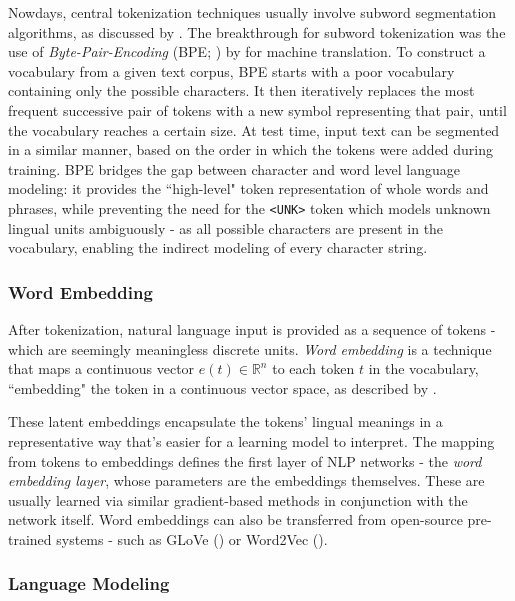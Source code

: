 \documentclass{article}
\begin{document}
\medskip
\noindent
Nowdays, central tokenization techniques usually involve subword segmentation algorithms, as discussed by \citet{mielke2021between}. The breakthrough for subword tokenization was the use of \emph{Byte-Pair-Encoding} (BPE; \citet{gage1994new}) by \citet{sennrich2015neural} for machine translation. To construct a vocabulary from a given text corpus, BPE starts with a poor vocabulary containing only the possible characters. It then iteratively replaces the most frequent successive pair of tokens with a new symbol representing that pair, until the vocabulary reaches a certain size. At test time, input text can be segmented in a similar manner, based on the order in which the tokens were added during training. BPE bridges the gap between character and word level language modeling: it provides the ``high-level" token representation of whole words and phrases, while preventing the need for the \texttt{<UNK>} token which models unknown lingual units ambiguously - as all possible characters are present in the vocabulary, enabling the indirect modeling of every character string.

\subsubsection{Word Embedding}
\label{subsec:embeddings}

After tokenization, natural language input is provided as a sequence of tokens - which are seemingly meaningless discrete units. \emph{Word embedding} is a technique that maps a continuous vector $e(t) \in \mathbb{R}^n$ to each token $t$ in the vocabulary, ``embedding" the token in a continuous vector space, as described by \citet{almeida2019word}.

\medskip
\noindent
These latent embeddings encapsulate the tokens' lingual meanings in a representative way that's easier for a learning model to interpret. The mapping from tokens to embeddings defines the first layer of NLP networks - the \emph{word embedding layer}, whose parameters are the embeddings themselves. These are usually learned via similar gradient-based methods in conjunction with the network itself. Word embeddings can also be transferred from open-source pre-trained systems - such as GLoVe (\citet{pennington2014glove}) or Word2Vec (\citet{mikolov2013efficient}).

\subsubsection{Language Modeling}
\label{subsec:lm}
\end{document}
